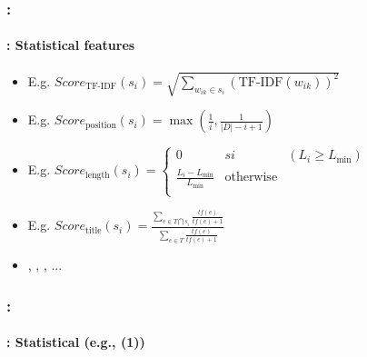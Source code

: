 \documentclass[xcolor=table]{beamer}
\begin{document}
\begin{frame}
	\frametitle{\insertshortsubtitle: \insertsection}
	\framesubtitle{\insertsubsection: Statistical features}
	
	\begin{itemize}
		\item {} 
		
		\hspace{.5cm}E.g. $Score_\text{TF-IDF}(s_i) = \sqrt{\sum\limits_{w_{ik} \in s_i} (\text{TF-IDF}(w_{ik}))^2}$
		
		\item {}
		
		\hspace{.5cm}E.g. $ Score_\text{position}(s_i) = \max (\frac{1}{i}, \frac{1}{|D| - i + 1}) $
		
		\item {}
		
		\hspace{.5cm}E.g. $ Score_\text{length}(s_i) = \left\lbrace 
		\begin{array}{lll}
		0 & si & (L_i \geq L_{\text{min}}) \\
		\frac{L_i - L_{\text{min}}}{L_{\text{min}}} & \text{otherwise} & \\
		\end{array}
		\right. $
		
		\item {}
		
		\hspace{.5cm}E.g. $ Score_{\text{title}}(s_i) = \frac{\sum_{e \in T \bigcap s_i}{\frac{tf(e)}{tf(e)+1}}}
		{\sum_{e \in T}{\frac{tf(e)}{tf(e)+1}}} $
		
		\item {}, , , ...
	\end{itemize}

\end{frame}

\begin{frame}
	\frametitle{\insertshortsubtitle: \insertsection}
	\framesubtitle{\insertsubsection: Statistical (e.g., \cite{13-aries-al} (1))}
	
	
\end{frame}
\end{document}
